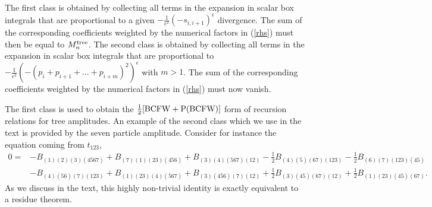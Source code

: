 \documentclass[12pt]{article}
\begin{document}
The first class is obtained by collecting all terms in the expansion in scalar box integrals that are proportional to a given $-\frac{1}{\epsilon^2}(-s_{i,i+1})^{\epsilon}$ divergence. The sum of the corresponding coefficients weighted by the numerical factors in (\ref{rhs}) must then be equal to $M_n^{\rm tree}$.
The second class is obtained by collecting all terms in the expansion in scalar box integrals that are proportional to $-\frac{1}{\epsilon^2}(-(p_i+p_{i+1}+\ldots + p_{i+m})^2)^{\epsilon}$ with $m>1$. The sum of the corresponding coefficients weighted by the numerical factors in (\ref{rhs}) must now vanish.

The first class is used to obtain the $\frac{1}{2}[{\rm BCFW} + {\rm P(BCFW)}]$ form of recursion relations for tree amplitudes. An example of the second class which we use in the text is provided by the seven particle amplitude. Consider for instance the equation coming from $t_{123}$,
%
\begin{eqnarray}
0 = & -B_{(1)(2)(3)(4567)} + B_{(7)(1)(23)(456)} + B_{(3)(4)(567)(12)} -\frac{1}{2}B_{(4)(5)(67)(123)} -\frac{1}{2}B_{(6)(7)(123)(45)} \nonumber \\ & -B_{(4)(56)(7)(123)} + B_{(1)(23)(4)(567)} + B_{(3)(456)(7)(12)} +\frac{1}{2} B_{(3)(45)(67)(12)} + \frac{1}{2} B_{(1)(23)(45)(67)}. \nonumber
\end{eqnarray}
%
As we discuss in the text, this highly non-trivial identity is exactly equivalent to a residue theorem.
\end{document}
